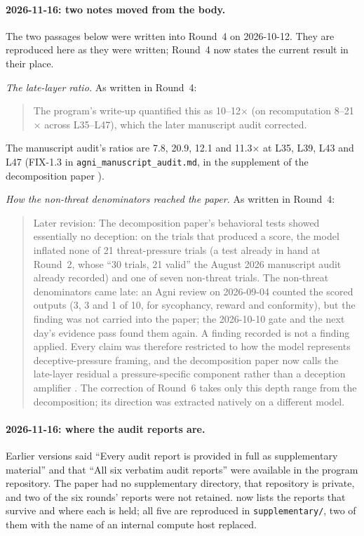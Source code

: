 \documentclass[11pt,letterpaper]{article}
\begin{document}
\paragraph{2026-11-16: two notes moved from the body.} The two passages below were written into
Round~4 on 2026-10-12. They are reproduced here as they were written; Round~4 now states the current
result in their place.

\emph{The late-layer ratio.} As written in Round~4:
\begin{quote}
The program's write-up quantified this as 10--12$\times$ (on recomputation 8--21$\times$ across
L35--L47), which the later manuscript audit corrected.
\end{quote}
The manuscript audit's ratios are 7.8, 20.9, 12.1 and 11.3$\times$ at L35, L39, L43 and L47 (FIX-1.3 in
\texttt{agni\_manuscript\_audit.md}, in the supplement of the decomposition paper
\cite{cc2026composites}).

\emph{How the non-threat denominators reached the paper.} As written in Round~4:
\begin{quote}
Later revision: The decomposition paper's behavioral tests showed essentially no deception: on the
trials that produced a score, the model inflated none of 21 threat-pressure trials (a test already in
hand at Round~2, whose ``30 trials, 21 valid'' the August 2026 manuscript audit already recorded) and
one of seven non-threat trials. The non-threat denominators came late: an Agni review on 2026-09-04
counted the scored outputs (3, 3 and 1 of 10, for sycophancy, reward and conformity), but the finding
was not carried into the paper; the 2026-10-10 gate and the next day's evidence pass found them again.
A finding recorded is not a finding applied. Every claim was therefore restricted to how the model
represents deceptive-pressure framing, and the decomposition paper now calls the late-layer residual a
pressure-specific component rather than a deception amplifier \cite{cc2026composites}. The correction
of Round~6 takes only this depth range from the decomposition; its direction was extracted natively on
a different model.
\end{quote}

\paragraph{2026-11-16: where the audit reports are.} Earlier versions said ``Every audit report is
provided in full as supplementary material'' and that ``All six verbatim audit reports'' were available
in the program repository. The paper had no supplementary directory, that repository is private, and
two of the six rounds' reports were not retained.  now lists the reports that survive
and where each is held; all five are reproduced in \texttt{supplementary/}, two of them with the name
of an internal compute host replaced.
\end{document}
